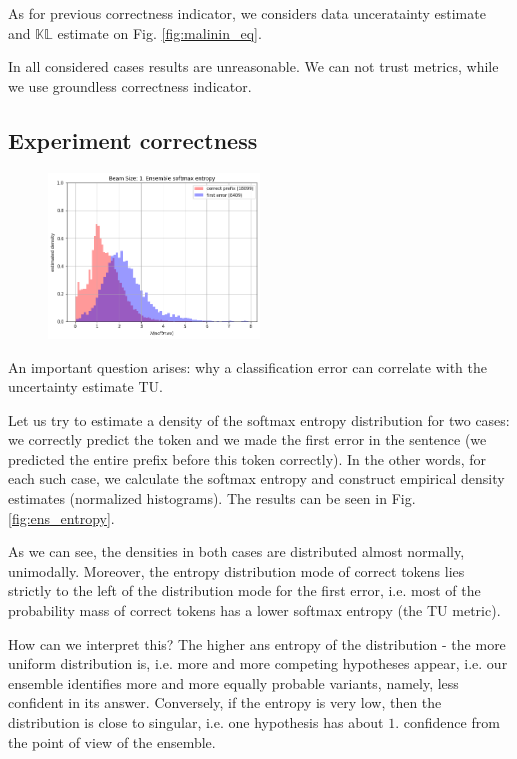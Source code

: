 \documentclass[a4paper,14pt]{extarticle}
\begin{document}
	As for previous correctness indicator, we considers data unceratainty estimate and $\mathbb{KL}$ estimate on Fig. \ref{fig:malinin_eq}.
	
	In all considered cases results are unreasonable. We can not trust metrics, while we use groundless correctness indicator.
	
\subsection{Experiment correctness}	
	\begin{figure}[t]
		\centering
		\includegraphics[width=0.5\textwidth]{images/ens_entropy.png}
	\end{figure}
	
	An important question arises: why a classification error can correlate with the uncertainty estimate TU.
	
	Let us try to estimate a density of the softmax entropy distribution for two cases: we correctly predict the token and we made the first error in the sentence (we predicted the entire prefix before this token correctly). In the other words, for each such case, we calculate the softmax entropy and construct empirical density estimates (normalized histograms). The results can be seen in Fig. \ref{fig:ens_entropy}.

	As we can see, the densities in both cases are distributed almost normally, unimodally. Moreover, the entropy distribution mode of correct tokens lies strictly to the left of the distribution mode for the first error, i.e. most of the probability mass of correct tokens has a lower softmax entropy (the TU metric).

	How can we interpret this? The higher ans entropy of the distribution - the more uniform distribution is, i.e. more and more competing hypotheses appear, i.e. our ensemble identifies more and more equally probable variants, namely, less confident in its answer. Conversely, if the entropy is very low, then the distribution is close to singular, i.e. one hypothesis has about $1.$ confidence from the point of view of the ensemble.
\end{document}
